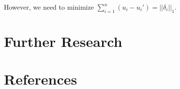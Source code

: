 \documentclass[11pt]{article}
\theoremstyle{definition}
\theoremstyle{corollary}
\begin{document}
    However, we need to minimize $\sum\limits_{i=1}^{n}(u_i-u_i') = ||\delta_i||_1$.

  \section{Further Research}

  \section{References}
\end{document}
